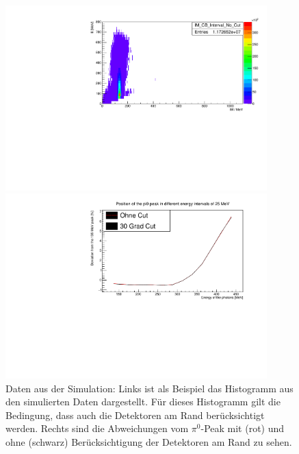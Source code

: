 \documentclass[a4paper,11pt,oneside,final,german,openbib,pdftex]{scrbook}
\begin{document}
{\begin{figure}[h!]
	\centering
	\begin{minipage}{0.45\textwidth}
		\centering
		\includegraphics[width=0.9\textwidth]{NewCalib/20171904SimNoCut2DHist}
	\end{minipage}
	\hfill
	\begin{minipage}{0.45\textwidth}
		\centering
		\includegraphics[width=0.9\textwidth]{NewCalib/20171904SimBothDeviation}
	\end{minipage}
	\caption[Simulation: 2D-Histogramm und Abweichung f\"ur symmmetrische Photonen]{Daten aus der Simulation: Links ist als Beispiel das Histogramm aus den simulierten Daten dargestellt. Für dieses Histogramm gilt die Bedingung, dass auch die Detektoren am Rand berücksichtigt werden. Rechts sind die Abweichungen vom $\pi^0$-Peak mit (rot) und ohne (schwarz) Berücksichtigung der Detektoren am Rand zu sehen.}
	\label{fig:Simulierte-Daten-Abweichung}
\end{figure}



}
\end{document}
